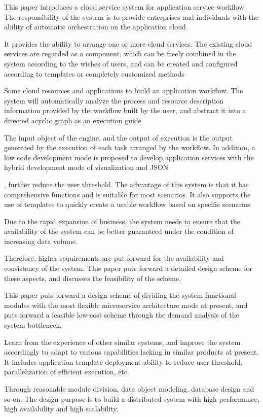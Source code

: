 \begin{abstract*}
  This paper introduces a cloud service system for application service workflow. The responsibility of the system is to provide enterprises and individuals with the ability of automatic orchestration on the application cloud.

  It provides the ability to arrange one or more cloud services. The existing cloud services are regarded as a component, which can be freely combined in the system according to the wishes of users, and can be created and configured according to templates or completely customized methods

  Some cloud resources and applications to build an application workflow. The system will automatically analyze the process and resource description information provided by the workflow built by the user, and abstract it into a directed acyclic graph as an execution guide

  The input object of the engine, and the output of execution is the output generated by the execution of each task arranged by the workflow. In addition, a low code development mode is proposed to develop application services with the hybrid development mode of visualization and JSON

  , further reduce the user threshold. The advantage of this system is that it has comprehensive functions and is suitable for most scenarios. It also supports the use of templates to quickly create a usable workflow based on specific scenarios.

  Due to the rapid expansion of business, the system needs to ensure that the availability of the system can be better guaranteed under the condition of increasing data volume.

  Therefore, higher requirements are put forward for the availability and consistency of the system. This paper puts forward a detailed design scheme for these aspects, and discusses the feasibility of the scheme,

  This paper puts forward a design scheme of dividing the system functional modules with the most flexible microservice architecture mode at present, and puts forward a feasible low-cost scheme through the demand analysis of the system bottleneck,

  Learn from the experience of other similar systems, and improve the system accordingly to adapt to various capabilities lacking in similar products at present. It includes application template deployment ability to reduce user threshold, parallelization of efficient execution, etc.

  Through reasonable module division, data object modeling, database design and so on. The design purpose is to build a distributed system with high performance, high availability and high scalability.

\end{abstract*}
